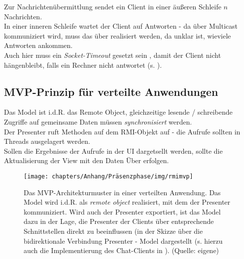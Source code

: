 \noindent
Zur Nachrichtenübermittlung sendet ein Client in einer äußeren Schleife $n$ Nachrichten.\\
In einer inneren Schleife wartet der Client auf Antworten - da über Multicast kommuniziert wird, muss das über  realisiert werden, da unklar ist, wieviele Antworten ankommen.\\
Auch hier muss ein \textit{Socket-Timeout} gesetzt sein , damit der Client nicht hängenbleibt, falls ein Rechner nicht antwortet (s. \cite[279, Listing 5.6]{Oec22}).

\subsection*{MVP-Prinzip für verteilte Anwendungen}

Das Model ist i.d.R. das Remote Object, gleichzeitige lesende / schreibende Zugriffe auf gemeinsame Daten müssen \textit{synchronisiert} werden.\\
Der Presenter ruft Methoden auf dem RMI-Objekt auf - die Aufrufe sollten in Threads ausgelagert werden.\\
Sollen die Ergebnisse der Aufrufe in der UI dargetsellt werden, sollte die Aktualisierung der View mit den Daten Über  erfolgen.


\begin{figure}
    \centering
    \texttt{[image: chapters/Anhang/Präsenzphase/img/rmimvp]}
    \caption{Das MVP-Architekturmuster in einer verteilten Anwendung. Das Model wird i.d.R. als \textit{remote object} realisiert, mit dem der Presenter kommuniziert.
    Wird auch der Presenter exportiert, ist das Model dazu in der Lage, die Presenter der Clients über entsprechende Schnittstellen direkt zu beeinflussen (in der Skizze über die bidirektionale Verbindung Presenter - Model dargestellt (s. hierzu auch die Implementierung des Chat-Clients in \cite[349, Bild 6.12]{Oec22}). (Quelle: eigene)}
    \label{fig:rmimvp}
\end{figure}
